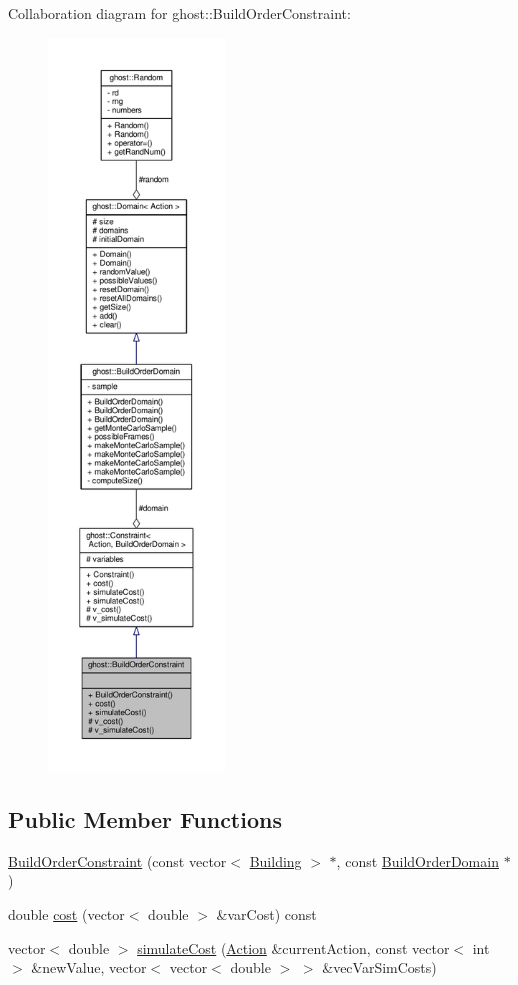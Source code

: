 Collaboration diagram for ghost\-:\-:Build\-Order\-Constraint\-:
\nopagebreak
\begin{figure}[H]
\begin{center}
\leavevmode
\includegraphics[height=550pt]{classghost_1_1BuildOrderConstraint__coll__graph}
\end{center}
\end{figure}
\subsection*{Public Member Functions}
\begin{DoxyCompactItemize}
\item 
\hyperlink{classghost_1_1BuildOrderConstraint_afb712742e6e2b6e5ee37e37fe9cc898f}{Build\-Order\-Constraint} (const vector$<$ \hyperlink{classghost_1_1Building}{Building} $>$ $\ast$, const \hyperlink{classghost_1_1BuildOrderDomain}{Build\-Order\-Domain} $\ast$)
\item 
double \hyperlink{classghost_1_1BuildOrderConstraint_a6700969d5de0d199e57fbe3f0a95ed68}{cost} (vector$<$ double $>$ \&var\-Cost) const 
\item 
vector$<$ double $>$ \hyperlink{classghost_1_1BuildOrderConstraint_aba2e25733f9a2903c14978a92a1c3b41}{simulate\-Cost} (\hyperlink{classghost_1_1Action}{Action} \&current\-Action, const vector$<$ int $>$ \&new\-Value, vector$<$ vector$<$ double $>$ $>$ \&vec\-Var\-Sim\-Costs)
\end{DoxyCompactItemize}
